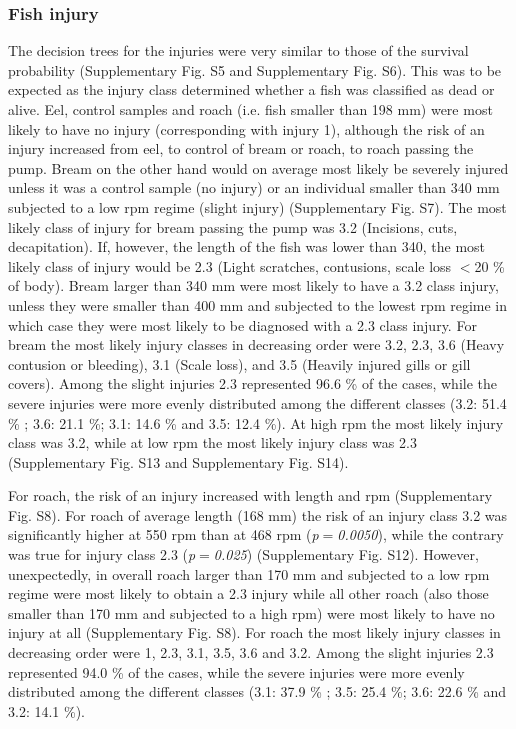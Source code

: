 \documentclass[fleqn,10pt]{wlscirep}
\begin{document}
\subsubsection*{Fish injury}

The decision trees for the injuries were very similar to those of the survival probability (Supplementary Fig. S5 and Supplementary Fig. S6). This was to be expected as the injury class determined whether a fish was classified as dead or alive. Eel, control samples and roach (i.e. fish smaller than 198 mm) were most likely to have no injury (corresponding with injury 1), although the risk of an injury increased from eel, to control of bream or roach, to roach passing the pump. Bream on the other hand would on average most likely be severely injured unless it was a control sample (no injury) or an individual smaller than 340 mm subjected to a low rpm regime (slight injury) (Supplementary Fig. S7). The most likely class of injury for bream passing the pump was 3.2 (Incisions, cuts, decapitation). If, however, the length of the fish was lower than 340, the most likely class of injury would be 2.3 (Light scratches, contusions, scale loss $<$20 \% of body). Bream larger than 340 mm were most likely to have a 3.2 class injury, unless they were smaller than 400 mm and subjected to the lowest rpm regime in which case they were most likely to be diagnosed with a 2.3 class injury. For bream the most likely injury classes in decreasing order were 3.2, 2.3, 3.6 (Heavy contusion or bleeding), 3.1 (Scale loss), and 3.5 (Heavily injured gills or gill covers). Among the slight injuries 2.3 represented 96.6 \% of the cases, while the severe injuries were more evenly distributed among the different classes (3.2: 51.4 \% ; 3.6: 21.1 \%; 3.1: 14.6 \% and 3.5: 12.4 \%). At high rpm the most likely injury class was 3.2, while at low rpm the most likely injury class was 2.3 (Supplementary Fig. S13 and Supplementary Fig. S14). 

For roach, the risk of an injury increased with length and rpm (Supplementary Fig. S8). For roach of average length (168 mm) the risk of an injury class 3.2 was significantly higher at 550 rpm than at 468 rpm (\textit{p$=$0.0050}), while the contrary was true for injury class 2.3 (\textit{p$=$0.025}) (Supplementary Fig. S12). However, unexpectedly, in overall roach larger than 170 mm and subjected to a low rpm regime were most likely to obtain a 2.3 injury while all other roach (also those smaller than 170 mm and subjected to a high rpm) were most likely to have no injury at all (Supplementary Fig. S8). For roach the most likely injury classes in decreasing order were 1, 2.3, 3.1, 3.5, 3.6 and 3.2. Among the slight injuries 2.3 represented 94.0 \% of the cases, while the severe injuries were more evenly distributed among the different classes (3.1: 37.9 \% ; 3.5: 25.4 \%; 3.6: 22.6 \% and 3.2: 14.1 \%).  
\end{document}
